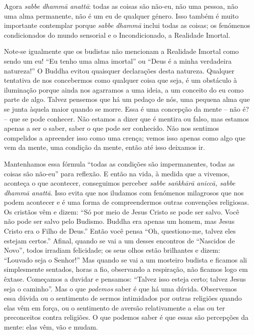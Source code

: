 Agora \emph{sabbe dhammā anattā}: todas as coisas são não-eu, não uma pessoa,
não uma alma permanente, não é um eu de qualquer género. Isso também é muito
importante contemplar porque \emph{sabbe dhammā} inclui todas as coisas; os
fenómenos condicionados do mundo sensorial e o Incondicionado, a Realidade
Imortal.

Note-se igualmente que os budistas não mencionam a Realidade Imortal como sendo
um eu! ``Eu tenho uma alma imortal'' ou ``Deus é a minha verdadeira natureza!''
O Buddha evitou quaisquer declarações desta natureza. Qualquer tentativa de nos
concebermos como qualquer coisa que seja, é um obstáculo à iluminação porque
ainda nos agarramos a uma ideia, a um conceito do eu como parte de algo. Talvez
pensemos que há um pedaço de nós, uma pequena alma que se junta àquela maior
quando se morre. Essa é uma concepção da mente -- não é? -- que se pode
conhecer. Não estamos a dizer que é mentira ou falso, mas estamos apenas a ser o
saber, saber o que pode ser conhecido. Não nos sentimos compelidos a apreender
isso como uma crença; vemos isso apenas como algo que vem da mente, uma condição
da mente, então até isso deixamos ir.

Mantenhamos essa fórmula ``todas as condições são impermanentes, todas as coisas
são não-eu'' para reflexão. E então na vida, à medida que a vivemos, aconteça o
que acontecer, conseguimos perceber \emph{sabbe saṅkhārā aniccā, sabbe dhammā
  anattā}. Isso evita que nos iludamos com fenómenos milagrosos que nos podem
acontecer e é uma forma de compreendermos outras convenções religiosas. Os
cristãos vêm e dizem: ``Só por meio de Jesus Cristo se pode ser salvo. Você não
pode ser salvo pelo Budismo. Buddha era apenas um homem, mas Jesus Cristo era o
Filho de Deus.'' Então você pensa ``Oh, questiono-me, talvez eles estejam
certos.'' Afinal, quando se vai a um desses encontros de ``Nascidos de Novo'',
todos irradiam felicidade; os seus olhos estão brilhantes e dizem: ``Louvado
seja o Senhor!'' Mas quando se vai a um mosteiro budista e ficamos ali
simplesmente sentados, horas a fio, observando a respiração, não ficamos logo em
êxtase. Começamos a duvidar e pensamos: ``Talvez isso esteja certo; talvez Jesus
seja o caminho''. Mas o que \emph{podemos} saber é que há uma dúvida. Observemos
essa dúvida ou o sentimento de sermos intimidados por outras religiões quando
elas vêm em força, ou o sentimento de aversão relativamente a elas ou ter
preconceitos contra religiões. O que podemos saber é que essas são percepções da
mente: elas vêm, vão e mudam.


